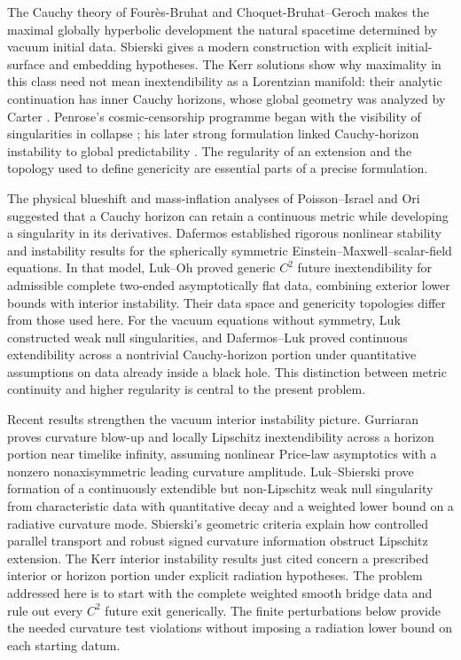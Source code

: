 The Cauchy theory of Four\`es-Bruhat and Choquet-Bruhat--Geroch
\cite{ChoquetBruhat1952,ChoquetBruhatGeroch1969} makes the maximal
globally hyperbolic development the natural spacetime determined by
vacuum initial data. Sbierski \cite{Sbierski2016} gives a modern
construction with explicit initial-surface and embedding hypotheses.
The Kerr solutions \cite{Kerr1963} show why maximality in this class
need not mean inextendibility as a Lorentzian manifold: their analytic
continuation has inner Cauchy horizons, whose global geometry was
analyzed by Carter \cite{Carter1968}. Penrose's cosmic-censorship
programme began with the visibility of singularities in collapse
\cite{Penrose1969}; his later strong formulation linked Cauchy-horizon
instability to global predictability \cite[Section~12.3.2]{Penrose1979}.
The regularity of an extension and the topology used to define
genericity are essential parts of a precise formulation.

The physical blueshift and mass-inflation analyses of Poisson--Israel
and Ori \cite{PoissonIsrael1990,Ori1991,Ori1992} suggested that a
Cauchy horizon can retain a continuous metric while developing a
singularity in its derivatives. Dafermos
\cite{Dafermos2003,Dafermos2005} established rigorous nonlinear
stability and instability results for the spherically symmetric
Einstein--Maxwell--scalar-field equations. In that model,
Luk--Oh \cite{LukOh2019I,LukOh2019II} proved generic \(C^2\)
future inextendibility for admissible complete two-ended asymptotically
flat data, combining exterior lower bounds with interior instability.
Their data space and genericity topologies differ from those used
here. For the vacuum equations without symmetry, Luk
\cite{Luk2018} constructed weak null singularities, and
Dafermos--Luk \cite{DafermosLuk2017} proved continuous extendibility
across a nontrivial Cauchy-horizon portion under quantitative assumptions
on data already inside a black hole. This distinction between metric
continuity and higher regularity is central to the present problem.

Recent results strengthen the vacuum interior instability picture.
Gurriaran \cite{Gurriaran2026} proves curvature blow-up and locally
Lipschitz inextendibility across a horizon portion near timelike
infinity, assuming nonlinear Price-law asymptotics with a nonzero
nonaxisymmetric leading curvature amplitude. Luk--Sbierski
\cite{LukSbierski2026} prove formation of a continuously extendible
but non-Lipschitz weak null singularity from characteristic data with
quantitative decay and a weighted lower bound on a radiative curvature
mode. Sbierski's geometric criteria
\cite{Sbierski2022,Sbierski2026} explain how controlled parallel
transport and robust signed curvature information obstruct Lipschitz
extension. The Kerr interior instability results just cited concern a
prescribed interior or horizon portion under explicit radiation hypotheses. The problem addressed
here is to start with the complete weighted smooth bridge data and
rule out every \(C^2\) future exit generically. The finite perturbations
below provide the needed curvature test violations without imposing a
radiation lower bound on each starting datum.

